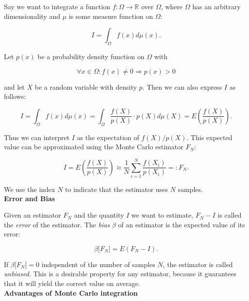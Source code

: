 Say we want to integrate a function $f:\Omega \rightarrow \mathbb{R}$ over $\Omega$, where $\Omega$ has an arbitrary dimensionality and $\mu$ is some measure function on $\Omega$:

\begin{equation}
\label{int f}
I = \int_\Omega f(x) d\mu(x).
\end{equation}

Let $p(x)$ be a probability density function on $\Omega$ with 

\begin{equation*}
\forall x \in \Omega: f(x) \neq 0 \Rightarrow p(x) > 0
\end{equation*}

and let $X$ be a random variable with density $p$. Then we can also express $I$ as follows:

\begin{equation*}
I = \int_\Omega f(x) d\mu(x) = \int_\Omega \frac{f(X)}{p(X)} \cdot p(X) d\mu(X) = E\left(\frac{f(X)}{p(X)}\right).
\end{equation*}

Thus we can interpret $I$ as the expectation of $f(X)/p(X)$. This expected value can be approximated using the Monte Carlo estimator $F_N$:

\begin{equation}
\label{f_n}
I = E\left(\frac{f(X)}{p(X)}\right) \approx \frac{1}{N}\sum_{i = 1}^N \frac{f(X_i)}{p(X_i)} =: F_N.
\end{equation}

We use the index $N$ to indicate that the estimator uses $N$ samples.\\

\textbf{Error and Bias}

Given an estimator $F_N$ and the quantity $I$ we want to estimate, $F_N - I$ is called the \emph{error} of the estimator. The \emph{bias} $\beta$ of an estimator is the expected value of its error:

\begin{equation*}
\beta\lbrack F_N\rbrack = E(F_N - I).
\end{equation*}

If $\beta\lbrack F_N\rbrack = 0$ independent of the number of samples $N$, the estimator is called \emph{unbiased}. This is a desirable property for any estimator, because it guarantees that it will yield the correct value on average.\\

\textbf{Advantages of Monte Carlo integration}

